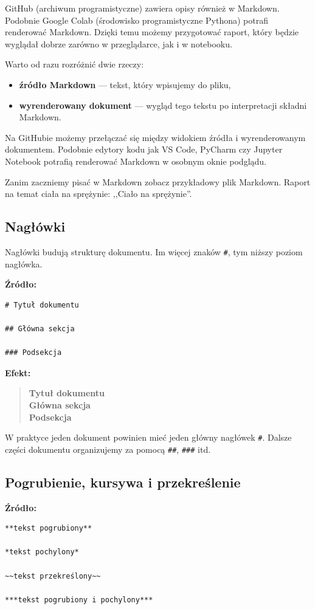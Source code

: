 \documentclass[11pt, a4paper]{article}
\begin{document}
GitHub (archiwum programistyczne) zawiera opisy również w Markdown. Podobnie Google Colab (środowisko programistyczne Pythona) potrafi renderować Markdown. Dzięki temu możemy przygotować raport, który będzie wyglądał dobrze zarówno w przeglądarce, jak i w notebooku.

Warto od razu rozróżnić dwie rzeczy:
\begin{itemize}
    \item \textbf{źródło Markdown} — tekst, który wpisujemy do pliku,
    \item \textbf{wyrenderowany dokument} — wygląd tego tekstu po interpretacji składni Markdown.
\end{itemize}

Na GitHubie możemy przełączać się między widokiem źródła i wyrenderowanym dokumentem. Podobnie edytory kodu jak VS Code, PyCharm czy Jupyter Notebook potrafią renderować Markdown w osobnym oknie podglądu.

Zanim zaczniemy pisać w Markdown zobacz przykładowy plik Markdown. Raport na temat ciała na sprężynie: ,,Ciało na sprężynie''.

\subsection{Nagłówki}
Nagłówki budują strukturę dokumentu. Im więcej znaków \texttt{\#}, tym niższy poziom nagłówka.

\textbf{Źródło:}
\begin{lstlisting}
# Tytuł dokumentu

## Główna sekcja

### Podsekcja
\end{lstlisting}

\textbf{Efekt:}
\begin{quote}
{\Large\bfseries Tytuł dokumentu}\\[0.5em]
{\large\bfseries Główna sekcja}\\[0.4em]
{\normalsize\bfseries Podsekcja}
\end{quote}

W praktyce jeden dokument powinien mieć jeden główny nagłówek \texttt{\#}. Dalsze części dokumentu organizujemy za pomocą \texttt{\#\#}, \texttt{\#\#\#} itd.

\hrulefill

\subsection{Pogrubienie, kursywa i przekreślenie}
\textbf{Źródło:}
\begin{lstlisting}
**tekst pogrubiony**

*tekst pochylony*

~~tekst przekreślony~~

***tekst pogrubiony i pochylony***
\end{lstlisting}
\end{document}
